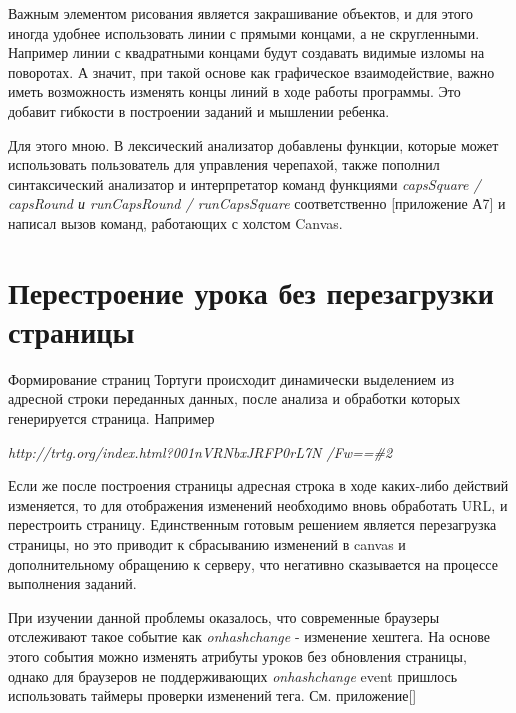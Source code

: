 Важным элементом рисования является закрашивание объектов, и для этого иногда удобнее использовать линии с прямыми концами, а не скругленными. Например линии с квадратными концами будут создавать видимые изломы на поворотах. А значит, при такой основе как графическое взаимодействие, важно иметь возможность  изменять  концы линий в ходе работы программы. Это добавит гибкости в построении заданий и мышлении ребенка.


Для этого мною. В лексический анализатор  добавлены функции, которые может использовать пользователь для управления черепахой, также пополнил синтаксический анализатор и интерпретатор команд функциями \textit{capsSquare / capsRound и runCapsRound / runCapsSquare} соответственно [приложение А7] и написал вызов команд, работающих с холстом Canvas.

\section{Перестроение урока без перезагрузки страницы} \label{sect1_1}


Формирование страниц Тортуги происходит динамически выделением из адресной строки переданных данных, после анализа и обработки которых генерируется страница.
Например 
 
 \begin{center}
 \vspace{6mm}
  \textit{ http://trtg.org/index.html?001nVRNbxJRFP0rL7N /Fw==\#2 }
 \end{center} 
 \vspace{6mm}
 
Если же после построения страницы адресная строка в ходе каких-либо действий изменяется, то для отображения изменений необходимо вновь обработать URL, и  перестроить страницу. Единственным готовым решением является  перезагрузка страницы, но это приводит к сбрасыванию изменений в canvas и дополнительному обращению к серверу, что негативно сказывается на процессе выполнения заданий. 

При изучении данной проблемы оказалось, что современные браузеры отслеживают такое событие как  \textit{onhashchange} - изменение хештега. На основе этого события  можно изменять атрибуты уроков без  обновления страницы, однако для браузеров не поддерживающих \textit{onhashchange} event пришлось использовать таймеры проверки изменений тега. См. приложение[]

